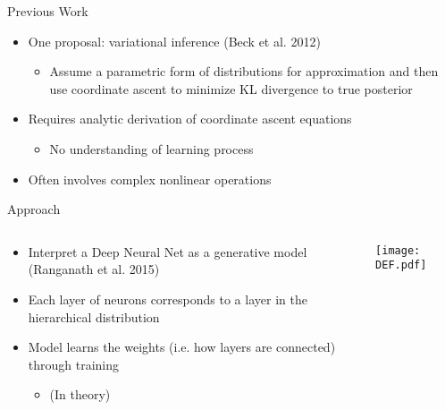 \documentclass{beamer}
\begin{document}
\begin{frame}{Previous Work}
  \begin{itemize}
  \item
  	One proposal: variational inference (Beck et al. 2012)
   \begin{itemize}
    \item
    	Assume a parametric form of distributions for approximation and then use coordinate ascent to minimize KL divergence to true posterior
  \end{itemize}
    \item
   	Requires analytic derivation of coordinate ascent equations
   \begin{itemize}
    \item
    	No understanding of learning process
  \end{itemize}
     \item
     	Often involves complex nonlinear operations
   \end{itemize}
\end{frame}

\begin{frame}{Approach}
  \begin{columns}[T]
    \begin{column}{.5\textwidth}
  	\begin{itemize}
  	\item
  	Interpret a Deep Neural Net as a generative model (Ranganath et al. 2015)
	\item
	Each layer of neurons corresponds to a layer in the hierarchical distribution
	\item
	Model learns the weights (i.e. how layers are connected) through training	
	\begin{itemize}
		\item
		(In theory)
	\end{itemize}
	\end{itemize}
    \end{column}
    \begin{column}{.5\textwidth}
   	\texttt{[image: DEF.pdf]}
    \end{column}
  \end{columns}
\end{frame}
\end{document}
